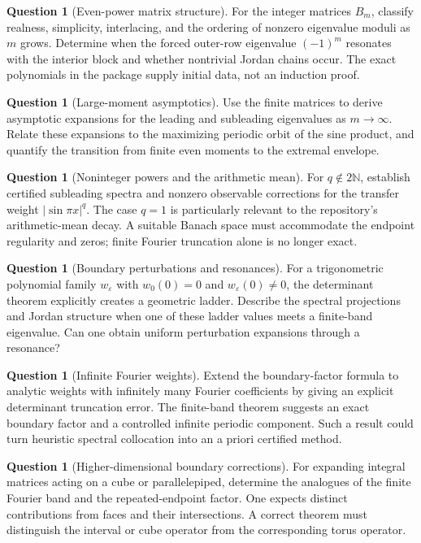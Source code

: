 \documentclass[11pt,a4paper]{article}
\theoremstyle{definition}
\newtheorem{question}[theorem]{Question}
\theoremstyle{remark}
\newcommand{\N}{\mathbb N}
\numberwithin{equation}{section}
\begin{document}
\begin{question}[Even-power matrix structure]
For the integer matrices $B_m$, classify realness, simplicity, interlacing,
and the ordering of nonzero eigenvalue moduli as $m$ grows. Determine when
the forced outer-row eigenvalue $(-1)^m$ resonates with the interior block
and whether nontrivial Jordan chains occur. The exact polynomials in the
package supply initial data, not an induction proof.
\end{question}

\begin{question}[Large-moment asymptotics]
Use the finite matrices to derive asymptotic expansions for the leading and
subleading eigenvalues as $m\to\infty$. Relate these expansions to the
maximizing periodic orbit of the sine product, and quantify the transition
from finite even moments to the extremal envelope.
\end{question}

\begin{question}[Noninteger powers and the arithmetic mean]
For $q\notin2\N$, establish certified subleading spectra and nonzero
observable corrections for the transfer weight $|\sin\pi x|^q$. The case
$q=1$ is particularly relevant to the repository's arithmetic-mean decay.
A suitable Banach space must accommodate the endpoint regularity and zeros;
finite Fourier truncation alone is no longer exact.
\end{question}

\begin{question}[Boundary perturbations and resonances]
For a trigonometric polynomial family $w_\varepsilon$ with
$w_0(0)=0$ and $w_\varepsilon(0)\ne0$, the determinant theorem explicitly
creates a geometric ladder. Describe the spectral projections and Jordan
structure when one of these ladder values meets a finite-band eigenvalue.
Can one obtain uniform perturbation expansions through a resonance?
\end{question}

\begin{question}[Infinite Fourier weights]
Extend the boundary-factor formula to analytic weights with infinitely many
Fourier coefficients by giving an explicit determinant truncation error.
The finite-band theorem suggests an exact boundary factor and a controlled
infinite periodic component. Such a result could turn heuristic spectral
collocation into an a priori certified method.
\end{question}

\begin{question}[Higher-dimensional boundary corrections]
For expanding integral matrices acting on a cube or parallelepiped,
determine the analogues of the finite Fourier band and the repeated-endpoint
factor. One expects distinct contributions from faces and their
intersections. A correct theorem must distinguish the interval or cube
operator from the corresponding torus operator.
\end{question}
\end{document}
